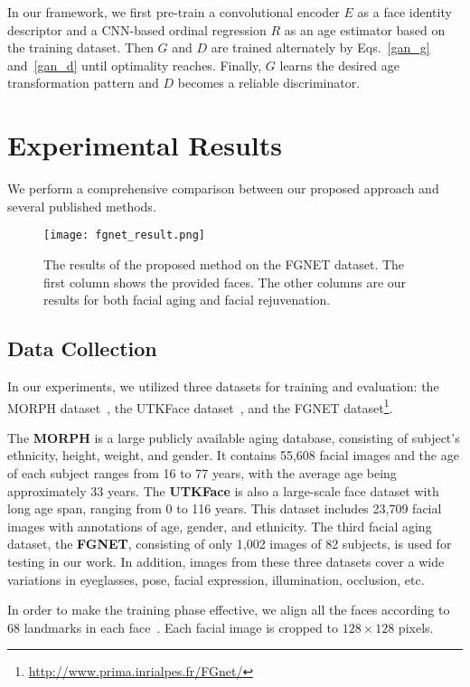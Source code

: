 \documentclass{article}
\begin{document}
In our framework, we first pre-train a convolutional encoder $E$ as a face identity descriptor and a CNN-based ordinal regression $R$ as an age estimator based on the training dataset. Then $G$ and $D$ are trained alternately by Eqs.~\eqref{gan_g} and~\eqref{gan_d} until optimality reaches. Finally, $G$ learns the desired age transformation pattern and $D$ becomes a reliable discriminator.

\section{Experimental Results}\label{exp}
We perform a comprehensive comparison between our proposed approach and several published methods.
\begin{figure*}[!ht]
\centering
\texttt{[image: fgnet\_result.png]}
\caption{The results of the proposed method on the FGNET dataset. The first column shows the provided faces. The other columns are our results for both facial aging and facial rejuvenation.}
\label{fgnet_result}
\end{figure*}
\subsection{Data Collection}
In our experiments, we utilized three datasets for training and evaluation: the MORPH dataset~\cite{ricanek2006morph}, the UTKFace dataset~\cite{zhang2017age}, and the FGNET dataset\footnote{\url{http://www.prima.inrialpes.fr/FGnet/}}.



The {\bf MORPH} is a large publicly available aging database, consisting of subject's ethnicity, height, weight, and gender. It contains 55,608 facial images and the age of each subject ranges from 16 to 77 years, with the average age being approximately 33 years. The {\bf UTKFace} is also a large-scale face dataset with long age span, ranging from 0 to 116 years. This dataset includes 23,709 facial images with annotations of age, gender, and ethnicity. The third facial aging dataset, the {\bf FGNET}, consisting of only 1,002 images of 82 subjects, is used for testing in our work. In addition, images from these three datasets cover a wide variations in eyeglasses, pose, facial expression, illumination, occlusion, etc.

In order to make the training phase effective, we align all the faces according to 68 landmarks in each face~\cite{kazemi2014one}. Each facial image is cropped to $128\times 128$ pixels.
\end{document}
